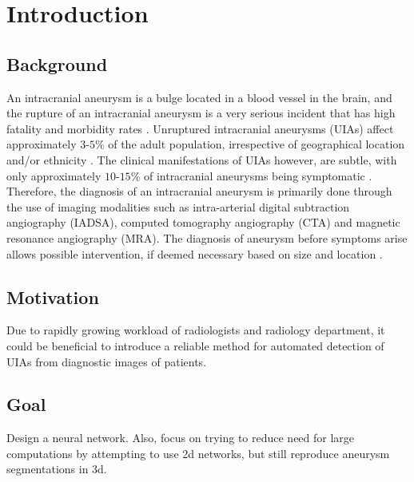 \chapter{Introduction}



\section{Background}
An intracranial aneurysm is a bulge located in a blood vessel in the brain, and the rupture of an intracranial aneurysm is a very serious incident that has high fatality and morbidity rates . Unruptured intracranial aneurysms (UIAs) affect approximately $3$-$5 \%$ of the adult population, irrespective of geographical location and/or ethnicity \cite{vlak2011prevalence}. The clinical manifestations of UIAs however, are subtle, with only approximately $10$-$15\%$ of intracranial aneurysms being symptomatic \cite{friedman2001small}.  Therefore, the diagnosis of an intracranial aneurysm is primarily done through the use of imaging modalities such as intra-arterial digital subtraction angiography (IADSA), computed tomography angiography (CTA) and magnetic resonance angiography (MRA). The diagnosis of aneurysm before symptoms arise allows possible intervention, if deemed necessary based on size and location .  

\section{Motivation}
Due to rapidly growing workload of radiologists and radiology department, it could be beneficial to introduce a reliable method for automated detection of UIAs from diagnostic images of patients. 


\section{Goal}
Design a neural network. Also, focus on trying to reduce need for large computations by attempting to use 2d networks, but still reproduce aneurysm segmentations in 3d. 







